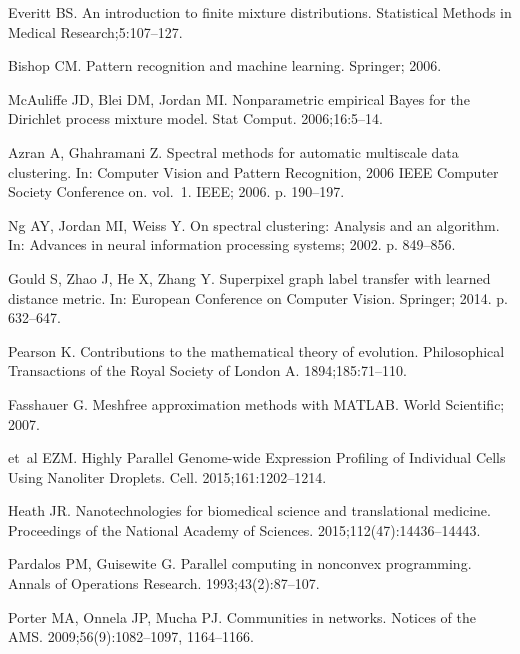 \documentclass[10pt,letterpaper]{article}
\begin{document}
\nolinenumbers
%
\begin{thebibliography}{10}

Everitt BS.
\newblock An introduction to finite mixture distributions.
\newblock Statistical Methods in Medical Research;5:107--127.

Bishop CM.
\newblock Pattern recognition and machine learning.
\newblock Springer; 2006.

McAuliffe JD, Blei DM, Jordan MI.
\newblock Nonparametric empirical Bayes for the Dirichlet process mixture
  model.
\newblock Stat Comput. 2006;16:5--14.

Azran A, Ghahramani Z.
\newblock Spectral methods for automatic multiscale data clustering.
\newblock In: Computer Vision and Pattern Recognition, 2006 IEEE Computer
  Society Conference on. vol.~1. IEEE; 2006. p. 190--197.

Ng AY, Jordan MI, Weiss Y.
\newblock On spectral clustering: Analysis and an algorithm.
\newblock In: Advances in neural information processing systems; 2002. p.
  849--856.

Gould S, Zhao J, He X, Zhang Y.
\newblock Superpixel graph label transfer with learned distance metric.
\newblock In: European Conference on Computer Vision. Springer; 2014. p.
  632--647.

Pearson K.
\newblock Contributions to the mathematical theory of evolution.
\newblock Philosophical Transactions of the Royal Society of London A.
  1894;185:71--110.

Fasshauer G.
\newblock Meshfree approximation methods with MATLAB.
\newblock World Scientific; 2007.

et~al EZM.
\newblock Highly Parallel Genome-wide Expression Profiling of Individual Cells
  Using Nanoliter Droplets.
\newblock Cell. 2015;161:1202--1214.

Heath JR.
\newblock Nanotechnologies for biomedical science and translational medicine.
\newblock Proceedings of the National Academy of Sciences.
  2015;112(47):14436--14443.

Pardalos PM, Guisewite G.
\newblock Parallel computing in nonconvex programming.
\newblock Annals of Operations Research. 1993;43(2):87--107.

Porter MA, Onnela JP, Mucha PJ.
\newblock Communities in networks.
\newblock Notices of the AMS. 2009;56(9):1082--1097, 1164--1166.


\end{thebibliography}
\end{document}
